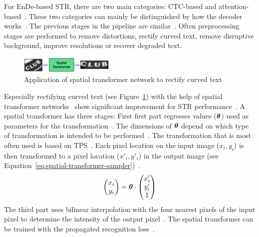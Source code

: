 For \ac{EnDe}-based \ac{STR}, there are two main categories: \ac{CTC}-based and
attention-based~\citep{chen_text_2021,cong_comparative_2019}.
These two categories can mainly be distinguished by how the decoder works~\citep{chen_text_2021}.
The previous stages in the pipeline are similar~\citep{long_scene_2021,chen_text_2021}.
Often preprocessing stages are performed to remove distortions, rectify curved text,
remove disruptive background, improve resolutions or recover degraded text.
\begin{figure}[h]
    \centering
    \includegraphics[width=0.4\textwidth]{img/STN-result-Liu-STAR-2016.png}
    \caption[Text rectification application]{%
        Application of spatial transformer network to rectify curved
        text~\citep{liu_star-net_2016}\label{fig:STN-application}
    }
\end{figure}
Especially rectifying curved text (see Figure~\ref{fig:STN-application}) with the help of
spatial transformer networks~\citep{jaderberg_spatial_2015} show significant improvement for \ac{STR}
performance~\citep{long_scene_2021,chen_text_2021}.
A spatial transformer has three stages:
First first part regresses values ($\boldsymbol{\theta}$) used as parameters for the
transformation~\citep{jaderberg_spatial_2015}.
The dimensions of $\boldsymbol{\theta}$ depend on which type of transformation is intended to be
performed~\citep{jaderberg_spatial_2015}.
The transformation that is most often used is based on
\ac{TPS}~\citep{bookstein_principal_1989,jaderberg_spatial_2015}.
Each pixel location on the input image ($x_i,y_i$) is then transformed to a pixel location
($x'_i,y'_i$) in  the output image (see
Equation~\ref{eq:spatial-transformer-sampler})~\citep{liu_star-net_2016}.
\begin{equation}\label{eq:spatial-transformer-sampler}
    \begin{pmatrix}
        x_i \\
        y_i
    \end{pmatrix}
    = \boldsymbol{\theta} \cdot
    \begin{pmatrix}
        x'_i \\
        y'_i \\
        1
    \end{pmatrix}
\end{equation}
The third part uses bilinear interpolation with the four nearest pixels of the input pixel to
determine the intensity of the output pixel~\citep{liu_star-net_2016}.
The spatial transformer can be trained with the propagated recognition
loss~\citep{liu_star-net_2016,jaderberg_spatial_2015}.

